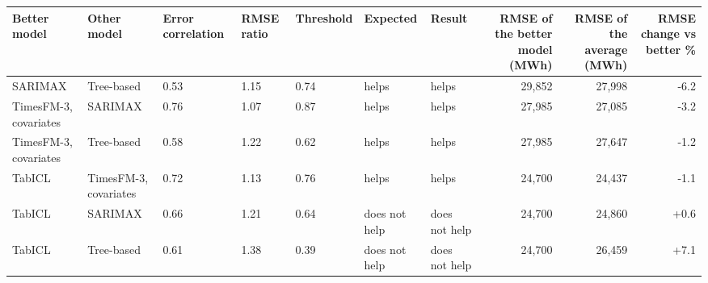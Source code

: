 \begin{tabular}{lllllllrrr}
\toprule
Better model & Other model & Error correlation & RMSE ratio & Threshold & Expected & Result & RMSE of the better model (MWh) & RMSE of the average (MWh) & RMSE change vs better \% \\
\midrule
SARIMAX & Tree-based & 0.53 & 1.15 & 0.74 & helps & helps & 29,852 & 27,998 & -6.2 \\
TimesFM-3, covariates & SARIMAX & 0.76 & 1.07 & 0.87 & helps & helps & 27,985 & 27,085 & -3.2 \\
TimesFM-3, covariates & Tree-based & 0.58 & 1.22 & 0.62 & helps & helps & 27,985 & 27,647 & -1.2 \\
TabICL & TimesFM-3, covariates & 0.72 & 1.13 & 0.76 & helps & helps & 24,700 & 24,437 & -1.1 \\
TabICL & SARIMAX & 0.66 & 1.21 & 0.64 & does not help & does not help & 24,700 & 24,860 & +0.6 \\
TabICL & Tree-based & 0.61 & 1.38 & 0.39 & does not help & does not help & 24,700 & 26,459 & +7.1 \\
\bottomrule
\end{tabular}
